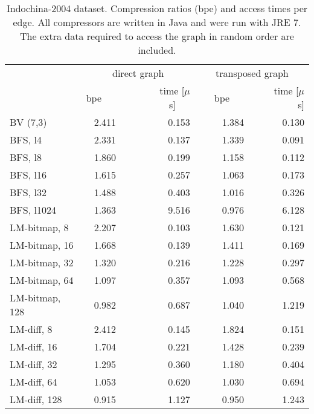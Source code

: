 \documentclass[envcountsame]{llncs}
\begin{document}
\begin{table}
\centering
\begin{tabular}{lrrrr}
\hline
        & \multicolumn{2}{c}{direct graph} & \multicolumn{2}{c}{transposed graph} \\
\cline{2-5}
        &  bpe~~~&~~~time [$\mu$s]~~~&~~~bpe~~~&~~~time [$\mu$s] \\
\hline
BV (7,3) & 2.411 & 0.153 & 1.384 & 0.130 \\
BFS, l4 & 2.331 & 0.137 & 1.339 & 0.091 \\
BFS, l8 & 1.860 & 0.199 & 1.158 & 0.112 \\
BFS, l16 & 1.615 & 0.257 & 1.063 & 0.173 \\
BFS, l32 & 1.488 & 0.403 & 1.016 & 0.326 \\
BFS, l1024 & 1.363 & 9.516 & 0.976 & 6.128 \\
LM-bitmap, 8 & 2.207 & 0.103 & 1.630 & 0.121 \\
LM-bitmap, 16 & 1.668 & 0.139 & 1.411 & 0.169 \\
LM-bitmap, 32 & 1.320 & 0.216 & 1.228 & 0.297 \\
LM-bitmap, 64 & 1.097 & 0.357 & 1.093 & 0.568 \\
LM-bitmap, 128 & 0.982 & 0.687 & 1.040 & 1.219 \\
LM-diff, 8 & 2.412 & 0.145 & 1.824 & 0.151 \\
LM-diff, 16 & 1.704 & 0.221 & 1.428 & 0.239 \\
LM-diff, 32 & 1.295 & 0.360 & 1.180 & 0.404 \\
LM-diff, 64 & 1.053 & 0.620 & 1.030 & 0.694 \\
LM-diff, 128 & 0.915 & 1.127 & 0.950 & 1.243 \\
\hline
\end{tabular}
\vspace{4mm}
\caption{Indochina-2004 dataset. Compression ratios (bpe) and access times per edge. 
All compressors are written in Java and were run with JRE 7.
The extra data required to access the graph in random order are included.
}
\label{table:app_indochina}
\end{table}
\end{document}
